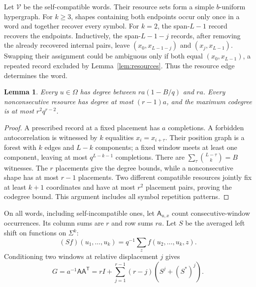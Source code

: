 \documentclass[12pt,letterpaper,onecolumn]{article}
\newtheorem{lemma}[theorem]{Lemma}
\theoremstyle{definition}
\newcommand{\cV}{\mathcal V}
\begin{document}
Let $\cV$ be the self-compatible words. Their resource sets form a simple $b$-uniform hypergraph. For $k\ge3$, shapes containing both endpoints occur only once in a word and together recover every symbol. For $k=2$, the span-$L-1$ record recovers the endpoints. Inductively, the span-$L-1-j$ records, after removing the already recovered internal pairs, leave $(x_0,x_{L-1-j})$ and $(x_j,x_{L-1})$. Swapping their assignment could be ambiguous only if both equal $(x_0,x_{L-1})$, a repeated record excluded by Lemma~\ref{lem:resources}. Thus the resource edge determines the word.

\begin{lemma}\label{lem:degrees}
Every $u\in\Omega$ has degree between $ra(1-B/q)$ and $ra$. Every nonconsecutive resource has degree at most $(r-1)a$, and the maximum codegree is at most $r^2q^{r-2}$.
\end{lemma}
\begin{proof}
A prescribed record at a fixed placement has $a$ completions. A forbidden autocorrelation is witnessed by $k$ equalities $x_i=x_{i+\tau}$. Their position graph is a forest with $k$ edges and $L-k$ components; a fixed window meets at least one component, leaving at most $q^{L-k-1}$ completions. There are $\sum_{\tau}\binom{L-\tau}k=B$ witnesses. The $r$ placements give the degree bounds, while a nonconsecutive shape has at most $r-1$ placements. Two different compatible resources jointly fix at least $k+1$ coordinates and have at most $r^2$ placement pairs, proving the codegree bound. This argument includes all symbol repetition patterns.
\end{proof}

On all words, including self-incompatible ones, let $\mathsf A_{u,x}$ count consecutive-window occurrences. Its column sums are $r$ and row sums $ra$. Let $S$ be the averaged left shift on functions on $\Sigma^k$:
\[
 (Sf)(u_1,\ldots,u_k)=q^{-1}\sum_z f(u_2,\ldots,u_k,z).
\]
Conditioning two windows at relative displacement $j$ gives
\begin{equation}
 G=a^{-1}\mathsf A\mathsf A^{\mathsf T}
 =rI+\sum_{j=1}^{r-1}(r-j)(S^j+(S^*)^j).
 \label{eq:Gram}
\end{equation}
\end{document}

